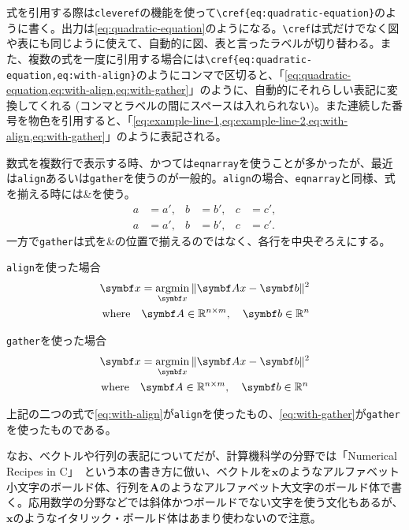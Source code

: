 式を引用する際は\texttt{cleveref}の機能を使って\texttt{\textbackslash cref\{eq:quadratic-equation\}}のように書く。出力は\cref{eq:quadratic-equation}のようになる。\texttt{\textbackslash cref}は式だけでなく図や表にも同じように使えて、自動的に図、表と言ったラベルが切り替わる。また、複数の式を一度に引用する場合には\texttt{\textbackslash cref\{eq:quadratic-equation,eq:with-align\}}のようにコンマで区切ると、「\cref{eq:quadratic-equation,eq:with-align,eq:with-gather}」のように、自動的にそれらしい表記に変換してくれる (コンマとラベルの間にスペースは入れられない)。また連続した番号を物色を引用すると、「\cref{eq:example-line-1,eq:example-line-2,eq:with-align,eq:with-gather}」のように表記される。

数式を複数行で表示する時、かつては\texttt{eqnarray}を使うことが多かったが、最近は\texttt{align}あるいは\texttt{gather}を使うのが一般的。\texttt{align}の場合、\texttt{eqnarray}と同様、式を揃える時には\&を使う。
%
\begin{align}
  a &= a', & b &= b', & c &= c', \label{eq:example-line-1} \\
  a &= a', & b &= b', & c &= c'. \label{eq:example-line-2}
\end{align}
%
一方で\texttt{gather}は式を\&の位置で揃えるのではなく、各行を中央ぞろえにする。
%
\begin{titlebox}{\texttt{align}を使った場合}
  \adjustdisplayskips{1mm}
  \begin{align}
    \mathbf{x} = \argmin_{\mathbf{x}} \| \mathbf{Ax} - \mathbf{b} \|^2 \nonumber \\
    \mbox{where} \quad \mathbf{A} \in \mathbb{R}^{n \times m}, \quad \mathbf{b} \in \mathbb{R}^n \label{eq:with-align}
  \end{align}
\end{titlebox}
%
\begin{titlebox}{\texttt{gather}を使った場合}
  \adjustdisplayskips{1mm}
  \begin{gather}
    \mathbf{x} = \argmin_{\mathbf{x}} \| \mathbf{Ax} - \mathbf{b} \|^2 \nonumber \\
    \mbox{where} \quad \mathbf{A} \in \mathbb{R}^{n \times m}, \quad \mathbf{b} \in \mathbb{R}^n \label{eq:with-gather}
  \end{gather}
\end{titlebox}
%
上記の二つの式で\cref{eq:with-align}が\texttt{align}を使ったもの、\cref{eq:with-gather}が\texttt{gather}を使ったものである。

なお、ベクトルや行列の表記についてだが、計算機科学の分野では「Numerical Recipes in C」~\cite{numrecipes}という本の書き方に倣い、ベクトルを$\mathbf{x}$のようなアルファベット小文字のボールド体、行列を$\mathbf{A}$のようなアルファベット大文字のボールド体で書く。応用数学の分野などでは斜体かつボールドでない文字を使う文化もあるが、${\boldsymbol x}$のようなイタリック・ボールド体はあまり使わないので注意。

